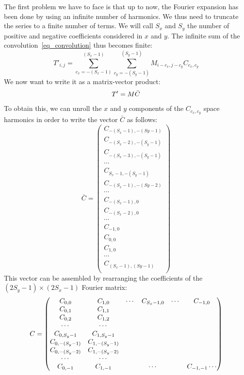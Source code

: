 The first problem we have to face is that up to now, the Fourier expansion has been done by using an infinite number of harmonics. We thus need to truncate the series to a finite number of terms. We will call $S_x$ and $S_y$ the number of positive and negative coefficients considered in $x$ and $y$. The infinite sum of the convolution~\eqref{eq_convolution} thus becomes finite:
\begin{equation}
T'_{i,j}=\sum_{c_x=-(S_x-1)}^{(S_x-1)}\sum_{c_y=-(S_y-1)}^{(S_y-1)}M_{i-c_x,j-c_y}C_{c_x,c_y}
\label{eq_finiteconvolution}
\end{equation}
We now want to write it as a matrix-vector product:
\begin{equation}
T'=M \bar{C}
\end{equation}
To obtain this, we can unroll the $x$ and $y$ components of the $C_{c_x,c_y}$ space harmonics in order to write the vector $\bar{C}$ as follows:
\begin{equation}
\bar{C}=
\begin{pmatrix}
C_{-(S_x-1),-(Sy-1)}\\
C_{-(S_x-2),-(S_y-1)}\\
C_{-(S_x-3),-(S_y-1)}\\
\cdots\\
C_{S_x-1,-(S_y-1)}\\
C_{-(S_x-1),-(Sy-2)}\\
\cdots\\
C_{-(S_x-1),0}\\
C_{-(S_x-2),0}\\
\cdots\\
C_{-1,0}\\
C_{0,0}\\
C_{1,0}\\
\cdots\\
C_{(S_x-1),(Sy-1)}\\
\end{pmatrix}
\end{equation}
This vector can be assembled by rearranging the coefficients of the $(2S_y-1)\times(2S_x-1)$ Fourier matrix:  
\begin{equation}
C=
\begin{pmatrix}
C_{0,0}     	& C_{1,0}			&\cdots	& C_{S_x-1,0}	& \cdots& C_{-1,0}\\
C_{0,1}     	& C_{1,1}			&		&				&		& \\
C_{0,2}     	& C_{1,2}			&		&				&		& \\
\cdots      	& \cdots			&		&				&		& \\
C_{0,S_y-1} 	& C_{1,S_y-1}		& 	    &				&       & \\
C_{0,-(S_y-1)} 	& C_{1,-(S_y-1)} 	&		&				&		& \\
C_{0,-(S_y-2)} 	& C_{1,-(S_y-2)} 	&		&				&		& \\
\cdots			& \cdots			&		&				&		& \\
C_{0,-1}		& C_{1,-1}			&		&	\cdots		&		& C_{-1,-1}
\cdots\\
\end{pmatrix}
\end{equation}
